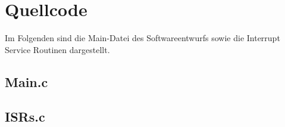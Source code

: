 \section{Quellcode}
\label{app:Quellcode}
Im Folgenden sind die Main-Datei des Softwareentwurfs sowie die Interrupt Service Routinen dargestellt.
\subsection{Main.c}

\subsection{ISRs.c}

%